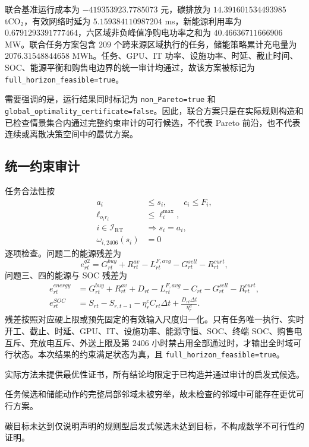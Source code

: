 联合基准运行成本为 $-419353923.7785073$ 元，碳排放为 $14.391601534493985$ tCO$_2$，有效网络时延为 $5.159384110987204$ ms，新能源利用率为 $0.6791293391777464$，六区域非负峰值净购电功率之和为 $40.46636711666906$ MW。联合任务方案包含 $209$ 个跨来源区域执行的任务，储能策略累计充电量为 $2076.31548844658$ MWh。任务、GPU、IT 功率、设施功率、时延、截止时间、SOC、能源平衡和购售电边界的统一审计均通过，故该方案被标记为 \texttt{full\_horizon\_feasible=true}。

需要强调的是，运行结果同时标记为 \texttt{non\_Pareto=true} 和 \texttt{global\_optimality\_certificate=false}。因此，联合方案只是在实际规则构造和已检查情景集合内通过完整约束审计的可行候选，不代表 Pareto 前沿，也不代表连续或离散决策空间中的最优方案。

\subsection{统一约束审计}

任务合法性按
\begin{align}
a_i&\le s_i,\qquad c_i\le F_i,\\
\ell_{o_ir_i}&\le\ell_i^{\max},\\
i\in\mathcal I_{\mathrm{RT}}&\Rightarrow s_i=a_i,\\
\omega_{i,2406}(s_i)&=0
\end{align}
逐项检查。问题二的能源残差为
\begin{equation}
e_{rt}^{q2}=G_{rt}^{buy}+R_{rt}^{av}
-L_{rt}^{F,avg}-G_{rt}^{sell}-R_{rt}^{curt},
\end{equation}
问题三、四的能源与 SOC 残差为
\begin{align}
e_{rt}^{energy}
&=G_{rt}^{buy}+R_{rt}^{av}+D_{rt}
-L_{rt}^{F,avg}-C_{rt}-G_{rt}^{sell}-R_{rt}^{curt},\\
e_{rt}^{SOC}
&=S_{rt}-S_{r,t-1}
-\eta_r^cC_{rt}\Delta t
+\frac{D_{rt}\Delta t}{\eta_r^d}.
\end{align}
残差按照对应硬上限或预先固定的有效输入尺度归一化。只有任务唯一执行、实时开工、截止、时延、GPU、IT、设施功率、能源守恒、SOC、终端 SOC、购售电互斥、充放电互斥、外送上限及第 $2406$ 小时禁占用全部通过时，才输出全时域可行状态。本次结果的约束满足状态为真，且 \texttt{full\_horizon\_feasible=true}。

实际方法未提供最优性证书，所有结论均限定于已构造并通过审计的启发式候选。

任务候选和储能动作的完整局部邻域未被穷举，故未检查的邻域中可能存在更优可行方案。

碳目标未达到仅说明声明的规则型启发式候选未达到目标，不构成数学不可行性的证明。

